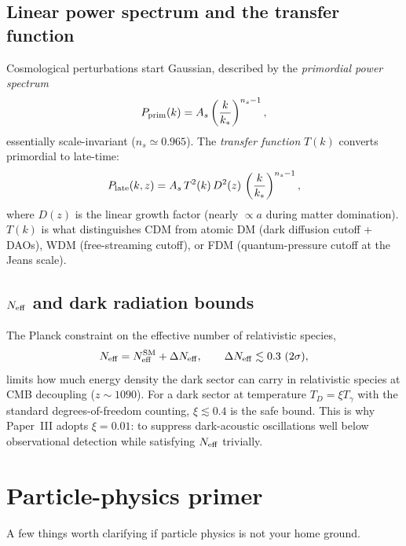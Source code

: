 \documentclass[12pt]{article}
\begin{document}
\subsection{Linear power spectrum and the transfer function}

Cosmological perturbations start Gaussian, described by the
\emph{primordial power spectrum}
%
\begin{equation}
  P_{\rm prim}(k) = A_s\left(\frac{k}{k_*}\right)^{n_s - 1},
\end{equation}
%
essentially scale-invariant ($n_s\simeq 0.965$).  The
\emph{transfer function} $T(k)$ converts primordial to late-time:
%
\begin{equation}
  P_{\rm late}(k, z) = A_s\,T^2(k)\,D^2(z)\,\left(\frac{k}{k_*}\right)^{n_s-1},
\end{equation}
%
where $D(z)$ is the linear growth factor
(nearly $\propto a$ during matter domination).  $T(k)$ is what
distinguishes CDM from atomic DM (dark diffusion cutoff + DAOs), WDM
(free-streaming cutoff), or FDM (quantum-pressure cutoff at the Jeans
scale).

\subsection{$N_{\rm eff}$ and dark radiation bounds}

The Planck constraint on the effective number of relativistic
species,
%
\begin{equation}
  N_{\rm eff} = N_{\rm eff}^{\rm SM} + \Delta N_{\rm eff},
  \qquad
  \Delta N_{\rm eff} \lesssim 0.3\ (2\sigma),
\end{equation}
%
limits how much energy density the dark sector can carry in
relativistic species at CMB decoupling ($z\sim 1090$).  For a dark
sector at temperature $T_D = \xi T_\gamma$ with the standard
degrees-of-freedom counting, $\xi \lesssim 0.4$ is the safe bound.
This is why Paper~III adopts $\xi = 0.01$: to suppress dark-acoustic
oscillations well below observational detection while satisfying
$N_{\rm eff}$ trivially.

\section{Particle-physics primer}
\label{app:particle_primer}

A few things worth clarifying if particle physics is not your
home ground.
\end{document}
